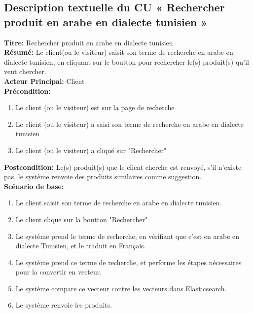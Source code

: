 \subsection{Description textuelle du CU « Rechercher produit en arabe en dialecte tunisien »}
\noindent
\textbf{Titre:} Rechercher produit en arabe en dialecte tunisien \\
\textbf{Résumé:} Le client(ou le visiteur) saisit son terme de recherche en arabe en dialecte tunisien, en cliquant sur le boutton pour rechercher le(s) produit(s) qu'il veut chercher. \\
\textbf{Acteur Principal:} Client \\
\textbf{Précondition:} \begin{enumerate}
	\item Le client (ou le visiteur) est sur la page de recherche
	\item Le client (ou le visiteur) a saisi son terme de recherche en arabe en dialecte tunisien
	\item Le client (ou le visiteur) a cliqué sur "Rechercher"
\end{enumerate}
\textbf{Postcondition:} Le(s) produit(s) que le client cherche est renvoyé, s'il n'existe pas, le système renvoie des produits similaires comme suggestion. \\
\textbf{Scénario de base: }
\begin{enumerate}
	\item Le client saisit son terme de recherche en arabe en dialecte tunisien.
	\item Le client clique sur la boutton "Rechercher"
	\item Le système prend le terme de recherche, en vérifiant que c'est en arabe en dialecte Tunisien, et le traduit en Français.
	\item Le système prend ce terme de recherche, et performe les étapes nécessaires pour la convertir en vecteur.
	\item Le système compare ce vecteur contre les vecteurs dans Elasticsearch.
	\item Le système renvoie les produits.
\end{enumerate}

